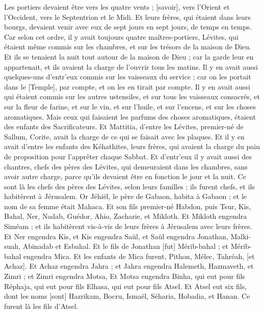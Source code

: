 \begin{multicols}{2}
Les portiers devaient être vers les quatre vents ; [savoir], vers l'Orient et l'Occident, vers le Septentrion et le Midi.
Et leurs frères, qui étaient dans leurs bourgs, devaient venir avec eux de sept jours en sept jours, de temps en temps.
Car selon cet ordre, il y avait toujours quatre maîtres-portiers, Lévites, qui étaient même commis sur les chambres, et sur les trésors de la maison de Dieu.
Et ils se tenaient la nuit tout autour de la maison de Dieu ; car la garde leur en appartenait, et ils avaient la charge de l'ouvrir tous les matins.
Il y en avait aussi quelques-uns d'entr'eux commis sur les vaisseaux du service ; car on les portait dans le [Temple], par compte, et on les en tirait par compte.
Il y en avait aussi qui étaient commis sur les autres ustensiles, et sur tous les vaisseaux consacrés, et sur la fleur de farine, et sur le vin, et sur l'huile, et sur l'encens, et sur les choses aromatiques.
Mais ceux qui faisaient les parfums des choses aromatiques, étaient des enfants des Sacrificateurs.
Et Mattitia, d'entre les Lévites, premier-né de Sallum, Corite, avait la charge de ce qui se faisait avec les plaques.
Et il y en avait d'entre les enfants des Kéhathites, leurs frères, qui avaient la charge du pain de proposition pour l'apprêter chaque Sabbat.
Et d'entr'eux il y avait aussi des chantres, chefs des pères des Lévites, qui demeuraient dans les chambres, sans avoir autre charge, parce qu'ils devaient être en fonction le jour et la nuit.
Ce sont là les chefs des pères des Lévites, selon leurs familles ; ils furent chefs, et ils habitèrent à Jérusalem.
Or Jéhiël, le père de Gabaon, habita à Gabaon ; et le nom de sa femme était Mahaca.
Et son fils premier-né Habdon, puis Tsur, Kis, Bahal, Ner, Nadab,
Guédor, Ahio, Zacharie, et Mikloth.
Et Mikloth engendra Siméam ; et ils habitèrent vis-à-vis de leurs frères à Jérusalem avec leurs frères.
Et Ner engendra Kis, et Kis engendra Saül, et Saül engendra Jonathan, Malki-suah, Abinadab et Esbahal.
Et le fils de Jonathan [fut] Mérib-bahal ; et Mérib-bahal engendra Mica.
Et les enfants de Mica furent, Pithon, Mélec, Tahréah, [et Achaz].
Et Achaz engendra Jahra ; et Jahra engendra Halemeth, Hazmaveth, et Zimri ; et Zimri engendra Motsa,
Et Motsa engendra Binha, qui eut pour fils Réphaja, qui eut pour fils Elhasa, qui eut pour fils Atsel.
Et Atsel eut six fils, dont les noms [sont] Hazrikam, Bocru, Ismaël, Séharia, Hobadia, et Hanan. Ce furent là les fils d'Atsel.

\end{multicols}
